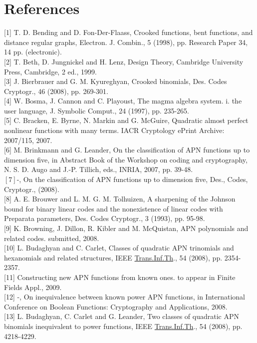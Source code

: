 \documentclass[10pt]{article}
\begin{document}
\section*{References}
[1] T. D. Bending and D. Fon-Der-Flaass, Crooked functions, bent functions, and distance regular graphs, Electron. J. Combin., 5 (1998), pp. Research Paper 34, 14 pp. (electronic).\\[0pt]
[2] T. Beth, D. Jungnickel and H. Lenz, Design Theory, Cambridge University Press, Cambridge, 2 ed., 1999.\\[0pt]
[3] J. Bierbrauer and G. M. Kyureghyan, Crooked binomials, Des. Codes Cryptogr., 46 (2008), pp. 269-301.\\[0pt]
[4] W. Bosma, J. Cannon and C. Playoust, The magma algebra system. i. the user language, J. Symbolic Comput., 24 (1997), pp. 235-265.\\[0pt]
[5] C. Bracken, E. Byrne, N. Markin and G. McGuire, Quadratic almost perfect nonlinear functions with many terms. IACR Cryptology ePrint Archive: 2007/115, 2007.\\[0pt]
[6] M. Brinkmann and G. Leander, On the classification of APN functions up to dimension five, in Abstract Book of the Workshop on coding and cryptography, N. S. D. Augo and J.-P. Tillich, eds., INRIA, 2007, pp. 39-48.\\
$[7]$-, On the classification of APN functions up to dimension five, Des., Codes, Cryptogr., (2008).\\[0pt]
[8] A. E. Brouwer and L. M. G. M. Tolhuizen, A sharpening of the Johnson bound for binary linear codes and the nonexistence of linear codes with Preparata parameters, Des. Codes Cryptogr., 3 (1993), pp. 95-98.\\[0pt]
[9] K. Browning, J. Dillon, R. Kibler and M. McQuistan, APN polynomials and related codes. submitted, 2008.\\[0pt]
[10] L. Budaghyan and C. Carlet, Classes of quadratic APN trinomials and hexanomials and related structures, IEEE \href{http://Trans.Inf.Th}{Trans.Inf.Th}., 54 (2008), pp. 2354-2357.\\[0pt]
[11] Constructing new APN functions from known ones. to appear in Finite Fields Appl., 2009.\\[0pt]
[12] -, On inequivalence between known power APN functions, in International Conference on Boolean Functions: Cryptography and Applications, 2008.\\[0pt]
[13] L. Budaghyan, C. Carlet and G. Leander, Two classes of quadratic APN binomials inequivalent to power functions, IEEE \href{http://Trans.Inf.Th}{Trans.Inf.Th}., 54 (2008), pp. 4218-4229.\\[0pt]
\end{document}

